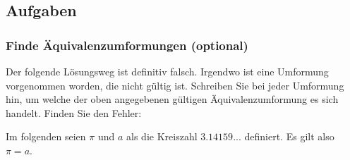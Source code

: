 \newpage

\subsection*{Aufgaben}






\newpage

\subsubsection{Finde Äquivalenzumformungen (optional)}
Der folgende Lösungsweg ist definitiv falsch. Irgendwo ist eine Umformung vorgenommen worden, die nicht gültig ist.
Schreiben Sie bei jeder Umformung hin, um welche der oben angegebenen gültigen Äquivalenzumformung es sich handelt. Finden Sie den Fehler:

Im folgenden seien $\pi$ und $a$ als die Kreiszahl $3.14159...$
definiert. Es gilt also $\pi = a$.


